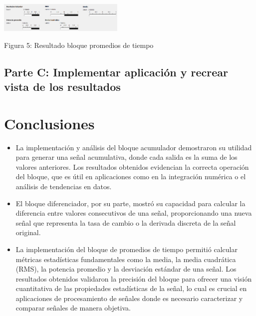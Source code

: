 \documentclass{journal}[IEEEtran, twocolumn]             %
\begin{document}
\begin{multicols}{2}
\begin{itemize}
        \end{itemize}
        
        \begin{center}
        \includegraphics[width=0.45\textwidth]{figs/F5.png}
        \caption{Figura 5: Resultado bloque promedios de tiempo}
        \end{center}
        
\subsection{Parte C: Implementar aplicación y recrear vista de los resultados}

\section{Conclusiones}

\begin{itemize}
    
    \item La implementación y análisis del bloque acumulador demostraron su utilidad para generar una señal acumulativa, donde cada salida es la suma de los valores anteriores. Los resultados obtenidos evidencian la correcta operación del bloque, que es útil en aplicaciones como en la integración numérica o el análisis de tendencias en datos.
    
    \item El bloque diferenciador, por su parte, mostró su capacidad para calcular la diferencia entre valores consecutivos de una señal, proporcionando una nueva señal que representa la tasa de cambio o la derivada discreta de la señal original.
    
    \item La implementación del bloque de promedios de tiempo permitió calcular métricas estadísticas fundamentales como la media, la media cuadrática (RMS), la potencia promedio y la desviación estándar de una señal. Los resultados obtenidos validaron la precisión del bloque para ofrecer una visión cuantitativa de las propiedades estadísticas de la señal, lo cual es crucial en aplicaciones de procesamiento de señales donde es necesario caracterizar y comparar señales de manera objetiva.
    
\end{itemize}


 

\end{multicols}
\end{document}
